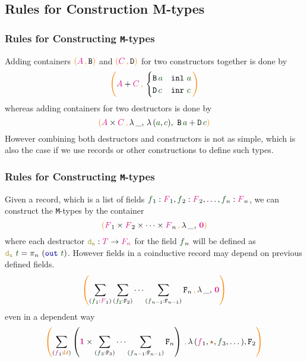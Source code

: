 \documentclass[xelatex,mathserif,serif,notheorems]{beamer} %
\theoremstyle{plain} %
\theoremstyle{definition}
\theoremstyle{remark}
\newcommand*{\term}[1]{\textcolor{green!30!black}{#1}} %
\newcommand*{\type}[1]{\textcolor{magenta!90!black}{#1}}
\newcommand*{\containerpair}[2]{\ensuremath{\colorlet{savedleftcolor}{.}\color{orange}\left(\color{savedleftcolor}#1\,\textcolor{orange}{\mathbf{,}}\,#2\color{orange}\right)\color{savedleftcolor}}}
\newcommand*{\containerpairsimple}[2]{\containerpair{#1}{\lambda\,\_,\,#2}}
\newcommand*{\universe}[1]{\textcolor{orange!80!black}{#1}}
\newcommand*{\unit}{\type{\textbf{1}}}
\newcommand*{\empt}{\type{\textbf{0}}}
\newcommand*{\constant}[1]{\textcolor{orange!60!black}{\ensuremath{\mathtt{#1}}}}
\newcommand*{\function}[1]{\textcolor{blue!60!black}{\ensuremath{\mathtt{#1}}}}
\newcommand*{\destructor}[1]{\textcolor{yellow!60!black}{\ensuremath{\mathtt{#1}}}}
\newcommand*{\typeformer}[1]{\ensuremath{\mathtt{#1}}}
\newcommand*{\unitelem}{\constant{\star}} %
\begin{document}
\subsection{Rules for Construction M-types}
\begin{frame}
  \frametitle{Rules for Constructing \texttt{M}-types}
  Adding containers \(\containerpair{\type{A}}{\typeformer{B}}\) and \(\containerpair{\type{C}}{\typeformer{D}}\) for two constructors together is done by
\begin{equation}
  \containerpair{\type{A} + \type{C}}{ \begin{cases} \typeformer{B}\,\term{a} & \mathtt{inl}~\term{a} \\ \typeformer{D}\,\term{c} & \mathtt{inr}~\term{c} \end{cases}}
\end{equation}
whereas adding containers for two destructors is done by
\begin{equation}
  \containerpairsimple{\type{A} \times \type{C}}{\lambda\,(\term{a},\term{c}),~\typeformer{B}\,\term{a} + \typeformer{D}\,\term{c}}  
\end{equation}
However combining both destructors and constructors is not as simple, which is also the case if we use records or other constructions to define such types.
\end{frame}

\begin{frame}
  \frametitle{Rules for Constructing \texttt{M}-types}
  Given a record, which is a list of fields \(\term{f}_1 : \type{F}_1,\term{f}_2 : \type{F}_2,\dots,\term{f}_n : \type{F}_n\), we can construct the \texttt{M}-types by the container
\begin{equation}
  \containerpairsimple{\type{F}_1 \times \type{F}_2 \times \dots \times \type{F}_n}{\empt}
\end{equation}
where each destructor \(\destructor{d_n} : \type{T} \rightarrow \type{F_n}\) for the field \(\term{f}_n\) will be defined as \(\destructor{d_n}~\term{t} = \pi_n~(\function{out}~\term{t})\). However fields in a coinductive record may depend on previous defined fields.
\begin{equation}
  \containerpairsimple{\sum_{(\term{f}_1 : \type{F}_1)} \sum_{(\term{f_2} : \typeformer{F}_2)} \cdots \sum_{(\term{f}_{n-1} : \typeformer{F}_{n-1})}\typeformer{F}_n}{\empt}
\end{equation}
even in a dependent way
\begin{equation}
  \containerpair{\sum_{(\type{f}_1 : \universe{\mathcal{U}})} \left(\unit \times \sum_{(\term{f}_3 : \typeformer{F}_3)} \cdots \sum_{(\term{f}_{n-1} : \typeformer{F}_{n-1})}\typeformer{F}_n\right)}{\lambda\,(\type{f}_1,\unitelem,\term{f}_3,\dots),\typeformer{F}_2}
\end{equation}
\end{frame}
\end{document}
